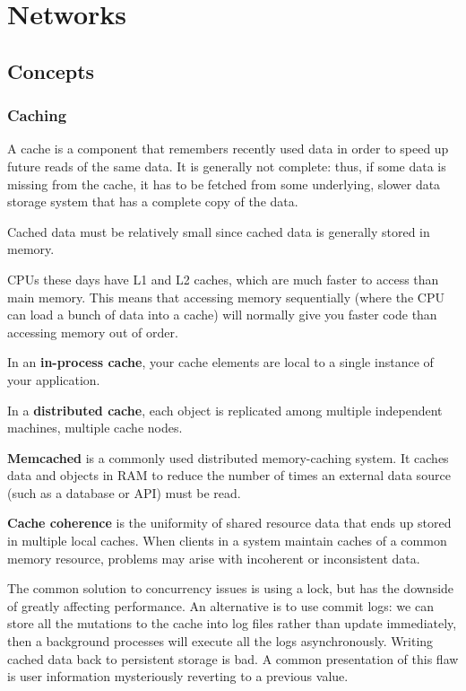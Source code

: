 \documentclass{article}
\begin{document}
\newpage
\section{Networks}
    \subsection{Concepts}
    
    \subsubsection{Caching}
    A cache is a component that remembers recently used data in order to speed up future reads of the same data. It is generally not complete: thus, if some data is missing from the cache, it has to be fetched from some underlying, slower data storage system that has a complete copy of the data.
    
    Cached data must be relatively small since cached data is generally stored in memory.
    
    CPUs these days have L1 and L2 caches, which are much faster to access than main memory. This means that accessing memory sequentially (where the CPU can load a bunch of data into a cache) will normally give you faster code than accessing memory out of order.
    
    In an \textbf{in-process cache}, your cache elements are local to a single instance of your application. 
    
    In a \textbf{distributed cache}, each object is replicated among multiple independent machines, multiple cache nodes.
    
    \textbf{Memcached} is a commonly used distributed memory-caching system. It caches data and objects in RAM to reduce the number of times an external data source (such as a database or API) must be read.
    
    \textbf{Cache coherence} is the uniformity of shared resource data that ends up stored in multiple local caches. When clients in a system maintain caches of a common memory resource, problems may arise with incoherent or inconsistent data.
    
    The common solution to concurrency issues is using a lock, but has the downside of greatly affecting performance. An alternative is to use commit logs: we can store all the mutations to the cache into log files rather than update immediately, then a background processes will execute all the logs asynchronously. Writing cached data back to persistent storage is bad. A common presentation of this flaw is user information mysteriously reverting to a previous value. 
    
\end{document}
